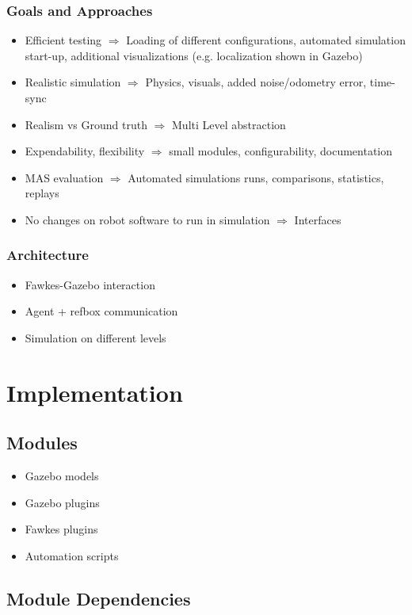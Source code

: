 \documentclass[a4paper,11pt]{article}
\begin{document}
\subsubsection{Goals and Approaches}
\begin{itemize}
\item Efficient testing $\Rightarrow$ Loading of different configurations, automated simulation start-up, additional visualizations (e.g. localization shown in Gazebo)
\item Realistic simulation $\Rightarrow$ Physics, visuals, added noise/odometry error, time-sync
\item Realism vs Ground truth $\Rightarrow$ Multi Level abstraction
\item Expendability, flexibility $\Rightarrow$ small modules, configurability, documentation
\item MAS evaluation $\Rightarrow$ Automated simulations runs, comparisons, statistics, replays
\item No changes on robot software to run in simulation $\Rightarrow$ Interfaces
\end{itemize}
\subsubsection{Architecture}
\begin{itemize}
\item Fawkes-Gazebo interaction
\item Agent + refbox communication
\item Simulation on different levels
\end{itemize}


\section{Implementation}
\subsection{Modules}
\begin{itemize}
\item Gazebo models
\item Gazebo plugins
\item Fawkes plugins
\item Automation scripts
\end{itemize}
\subsection{Module Dependencies}
\end{document}
